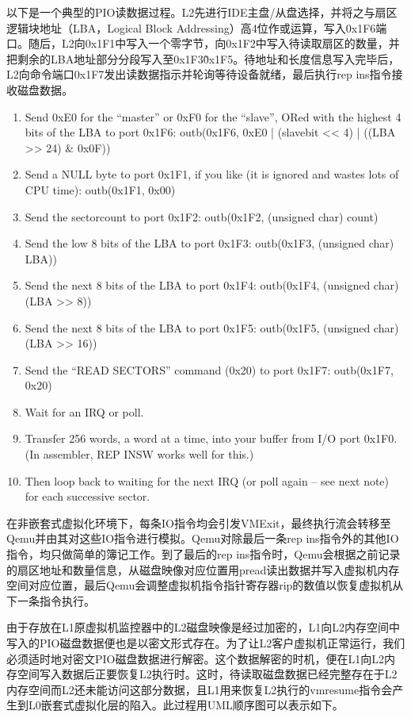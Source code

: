 以下是一个典型的PIO读数据过程。L2先进行IDE主盘/从盘选择，并将之与扇区逻辑块地址（LBA，Logical Block Addressing）高4位作或运算，写入0x1F6端口。随后，L2向0x1F1中写入一个零字节，向0x1F2中写入待读取扇区的数量，并把剩余的LBA地址部分分段写入至0x1F3\~0x1F5。待地址和长度信息写入完毕后，L2向命令端口0x1F7发出读数据指示并轮询等待设备就绪，最后执行rep ins指令接收磁盘数据。

\begin{enumerate}
\item Send 0xE0 for the ``master'' or 0xF0 for the ``slave'', ORed with the highest 4 bits of the LBA to port 0x1F6: outb(0x1F6, 0xE0 | (slavebit << 4) | ((LBA >> 24) & 0x0F))
\item Send a NULL byte to port 0x1F1, if you like (it is ignored and wastes lots of CPU time): outb(0x1F1, 0x00)
\item Send the sectorcount to port 0x1F2: outb(0x1F2, (unsigned char) count)
\item Send the low 8 bits of the LBA to port 0x1F3: outb(0x1F3, (unsigned char) LBA))
\item Send the next 8 bits of the LBA to port 0x1F4: outb(0x1F4, (unsigned char)(LBA >> 8))
\item Send the next 8 bits of the LBA to port 0x1F5: outb(0x1F5, (unsigned char)(LBA >> 16))
\item Send the ``READ SECTORS'' command (0x20) to port 0x1F7: outb(0x1F7, 0x20)
\item Wait for an IRQ or poll.
\item Transfer 256 words, a word at a time, into your buffer from I/O port 0x1F0. (In assembler, REP INSW works well for this.)
\item Then loop back to waiting for the next IRQ (or poll again -- see next note) for each successive sector.
\end{enumerate}

在非嵌套式虚拟化环境下，每条IO指令均会引发VMExit，最终执行流会转移至Qemu并由其对这些IO指令进行模拟。Qemu对除最后一条rep ins指令外的其他IO指令，均只做简单的簿记工作。到了最后的rep ins指令时，Qemu会根据之前记录的扇区地址和数量信息，从磁盘映像对应位置用pread读出数据并写入虚拟机内存空间对应位置，最后Qemu会调整虚拟机指令指针寄存器rip的数值以恢复虚拟机从下一条指令执行。

由于存放在L1原虚拟机监控器中的L2磁盘映像是经过加密的，L1向L2内存空间中写入的PIO磁盘数据便也是以密文形式存在。为了让L2客户虚拟机正常运行，我们必须适时地对密文PIO磁盘数据进行解密。这个数据解密的时机，便在L1向L2内存空间写入数据后正要恢复L2执行时。这时，待读取磁盘数据已经完整存在于L2内存空间而L2还未能访问这部分数据，且L1用来恢复L2执行的vmresume指令会产生到L0嵌套式虚拟化层的陷入。此过程用UML顺序图可以表示如下。

